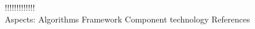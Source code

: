 \documentclass[a4paper]{article}
\begin{document}


!!!!!!!!!!!!! \\
Aspects:
    Algorithms
    Framework
    Component technology
References \cite{porter2000location}






{}
\end{document}
